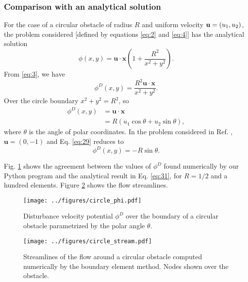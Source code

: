 \documentclass[11pt]{article}
\begin{document}
\subsubsection{Comparison with an analytical solution}
For the case of a circular obstacle of radius $R$ and uniform velocity ${\bf u}=(u_1, u_2)$, the problem considered [defined by equations \eqref{eq:2} and \eqref{eq:4}] has the analytical solution
\begin{equation}
  \label{eq:27}
  \phi(x,y) = \mathbf{u}\cdot\mathbf{x}\left(1 + \frac{R^2}{x^2+y^2}\right).
\end{equation}
From \eqref{eq:3}, we have
  \begin{equation}
    \label{eq:28}
    \phi^D(x,y) = \frac{R^2\mathbf{u}\cdot\mathbf{x}}{x^2 + y^2}.
  \end{equation}
  Over the circle boundary $x^2 + y^2 = R^2$, so
  \begin{align}
    \phi^D(x,y) &= \mathbf{u}\cdot\mathbf{x} \\
              &= R(u_1\cos\theta + u_2\sin\theta),    \label{eq:29}
  \end{align}
  where $\theta$ is the angle of polar coordinates. In the problem considered in Ref. \cite{zhevandrov2025discrete}, $\mathbf{u} = (0, -1)$ and Eq. \eqref{eq:29} reduces to
  \begin{equation}
    \label{eq:31}
    \phi^D(x,y) = -R\sin\theta.
  \end{equation}

  Fig. \ref{fig:circle_phi} shows the agreement between the values of $\phi^D$ found numerically by our Python program and the analytical result in Eq. \eqref{eq:31}, for $R=1/2$ and a hundred elements. Figure \ref{fig:circle_stream} shows the flow streamlines.
\begin{figure}[h]
  \centering
      \texttt{[image: ../figures/circle\_phi.pdf]}
  \caption{Disturbance velocity potential $\phi^D$ over the boundary of a circular obstacle parametrized by the polar angle $\theta$.}
  \label{fig:circle_phi}
\end{figure}
\begin{figure}[h]
  \centering
      \texttt{[image: ../figures/circle\_stream.pdf]}
  \caption{Streamlines of the flow around a circular obstacle computed numerically by the boundary element method. Nodes shown over the obstacle.}
  \label{fig:circle_stream}
\end{figure}
\end{document}
